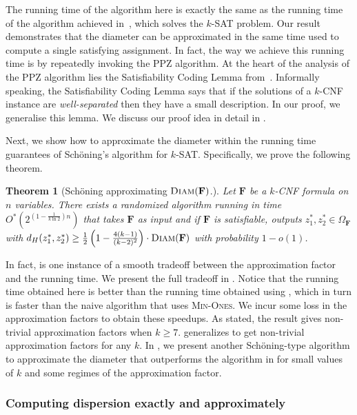 \documentclass[11pt, letterpaper]{article}
\newtheorem{theorem}{Theorem}
\theoremstyle{definition}
\newcommand{\f}{\mathbf{F}}
\newcommand{\Om}{\Omega_{\f}}
\newcommand{\minones}{\textsc{Min-Ones}\xspace}
\newcommand{\D}{\textsc{Diam}}
\newcommand{\sch}{Sch\"{o}ning\xspace}
\begin{document}
The running time of the algorithm here is exactly the same as the running time of the algorithm achieved in~\cite{PPZ}, which solves the $k$-SAT problem. Our result demonstrates that the diameter can be approximated in the same time used to compute a single satisfying assignment. In fact, the way we achieve this running time is by repeatedly invoking the PPZ algorithm. At the heart of the analysis of the PPZ algorithm lies the Satisfiability Coding Lemma from~\cite{PPZ}. Informally speaking, the Satisfiability Coding Lemma says that if the solutions of a $k$-CNF instance are \emph{well-separated} then they have a small description. In our proof, we generalise this lemma. We discuss our proof idea in detail in . 

Next, we show how to approximate the diameter within the running time guarantees of \sch's algorithm for $k$-SAT. Specifically, we prove the following theorem. 
\begin{theorem}[\sch approximating $\D(\f)$.]
    \label{thm:sch-for-dia-fixedapprox}
    Let $\f$ be a $k$-CNF formula on $n$ variables. There exists a randomized algorithm running in time $O^*\!\left(2^{ (1-\frac{1}{k \ln 2})n}\right)$ that takes $\f$ as input and if $\f$ is satisfiable, outputs $z_1^*, z_2^* \in \Om$ with $d_H(z_1^*, z_2^*) \geq \frac{1}{2}\left(1-\frac{4(k-1)}{(k-2)^2}\right) \cdot \D(\f)$ with probability $1-o(1)$.
\end{theorem}


In fact,  is one instance of a smooth tradeoff between the approximation factor and the running time. We present the full tradeoff in  .
Notice that the running time obtained here is better than the running time obtained using , which in turn is faster than the naive algorithm that uses \minones. We incur some loss in the approximation factors to obtain these speedups. As stated, the result gives non-trivial approximation factors when $k\geq 7$.  generalizes  to get non-trivial approximation factors for any $k$. In  , we present another \sch-type algorithm to approximate the diameter that outperforms the algorithm in  for small values of $k$ and some regimes of the approximation factor. 

\subsubsection{Computing dispersion exactly and approximately}
\end{document}
